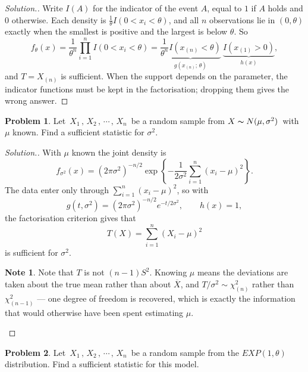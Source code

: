 \documentclass[12pt,a4paper]{report}
\theoremstyle{definition}
\newtheorem*{note}{Note}
\newtheorem{problemx}{Problem}[section]
\newenvironment{problem}{\begin{problemx}}{\end{problemx}}
\newenvironment{solution}
  {\renewcommand{\qedsymbol}{}\begin{proof}[\textit{Solution}.]}
  {\end{proof}}
\begin{document}
\begin{solution}
Write $I(A)$ for the indicator of the event $A$, equal to $1$ if $A$ holds and
$0$ otherwise. Each density is $\frac1\theta I(0<x_i<\theta)$, and all $n$
observations lie in $(0, \theta)$ exactly when the smallest is positive and the
largest is below $\theta$. So
\[f_\theta(x) = \frac{1}{\theta^n}\prod_{i=1}^n I(0<x_i<\theta)
= \underbrace{\frac{1}{\theta^n}I\left(x_{(n)}<\theta\right)}_{g(x_{(n)};\,\theta)}\ \underbrace{I\left(x_{(1)}>0\right)}_{h(x)},\]
and $T = X_{(n)}$ is sufficient. When the support depends on the parameter, the
indicator functions must be kept in the factorisation; dropping them gives the
wrong answer.
\end{solution}

\begin{problem}
Let $\, X_1\, , \, X_2\, , \, \cdots \, , \, X_n\,$  be a random sample from  $X\thicksim N(\mu, \sigma^2)\,$ with $\mu$ known. Find a sufficient statistic for $\sigma^2$.
\end{problem}

\begin{solution}
With $\mu$ known the joint density is
\[f_{\sigma^{2}}(x) = \left(2\pi\sigma^{2}\right)^{-n/2}
\exp\left\{-\frac{1}{2\sigma^{2}}\sum_{i=1}^{n}\left(x_i-\mu\right)^{2}\right\}.\]
The data enter only through $\sum_{i=1}^{n}(x_i-\mu)^{2}$, so with
\[g(t,\sigma^{2}) = \left(2\pi\sigma^{2}\right)^{-n/2}e^{-t/2\sigma^{2}},
\qquad h(x)=1,\]
the factorisation criterion gives that
\[T(X) = \sum_{i=1}^{n}\left(X_i-\mu\right)^{2}\]
is sufficient for $\sigma^{2}$.

\begin{note}
Note that $T$ is not $ (n-1)S^{2}$. Knowing $\mu$ means the deviations are taken
about the true mean rather than about $\overline{X}$, and $T/\sigma^{2}\sim\chi^{2}_{(n)}$
rather than $\chi^{2}_{(n-1)}$ --- one degree of freedom is recovered, which is
exactly the information that would otherwise have been spent estimating $\mu$.
\end{note}
\end{solution}

\begin{problem}
Let $\, X_1\, , \, X_2\, , \, \cdots \, , \, X_n\,$  be a random sample from the $EXP(1,\theta)$ distribution. Find a sufficient statistic for this model.
\end{problem}
\end{document}
